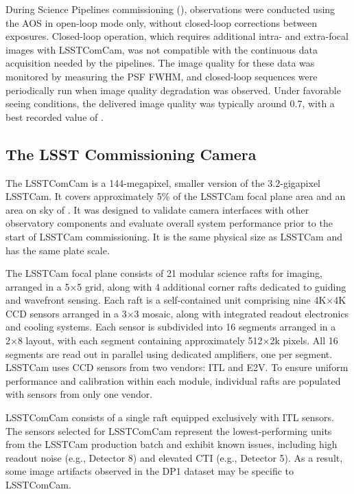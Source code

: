 During Science Pipelines commissioning (),  observations were conducted using the AOS in open-loop mode only, without closed-loop corrections between exposures. 
Closed-loop operation, which requires additional intra- and extra-focal images with LSSTComCam, was not compatible with the continuous data acquisition needed by the pipelines.
The image quality for these data was monitored by measuring the \gls{PSF} \gls{FWHM}, and closed-loop sequences were periodically run when image quality degradation was observed.
Under favorable \gls{seeing} conditions, the delivered image quality was typically around {0.7\arcsec\xspace}, with a best
recorded value of \bestimagequality.

\subsection{The LSST Commissioning Camera
\label{ssec:comcam}}
The \gls{LSSTComCam} \citep{10.71929/rubin/2561361,2022SPIE12184E..0JS,2020SPIE11447E..0LS,2018SPIE10700E..3DH} is a 144-megapixel, smaller version of the 3.2-gigapixel \gls{LSSTCam}.
It covers approximately 5\% of the \gls{LSSTCam} focal plane area and an area on sky of \comcamarea .
It was  designed to validate camera interfaces with other observatory components and evaluate overall system performance prior to the start of \gls{LSSTCam} commissioning.
It is the same physical size  as LSSTCam and has the same plate scale. 

The \gls{LSSTCam} focal plane consists of 21 modular science rafts for imaging, arranged in a 5×5 grid, along with 4 additional corner rafts dedicated to guiding and wavefront sensing.
Each raft is a self-contained unit comprising nine 4K×4K \gls{CCD} sensors arranged in a 3×3 mosaic, along with integrated readout electronics and cooling systems.
Each sensor is subdivided into 16 segments arranged in a 2×8 layout, with each segment containing approximately 512×2k pixels.
All 16 segments are read out in parallel using dedicated amplifiers, one per segment.
\gls{LSSTCam} uses CCD sensors from two vendors: \gls{ITL} and \gls{E2V}.
To ensure uniform performance and \gls{calibration} within each module, individual rafts are populated with sensors from only one vendor.

LSSTComCam consists of a single raft equipped exclusively with \gls{ITL} sensors.
The sensors selected for \gls{LSSTComCam} represent the lowest-performing units from the LSSTCam production batch and exhibit known issues, including high readout noise (e.g., Detector 8) and elevated \gls{CTI} (e.g., Detector 5).
As a result, some image artifacts observed in the \gls{DP1} dataset may be specific to LSSTComCam.


